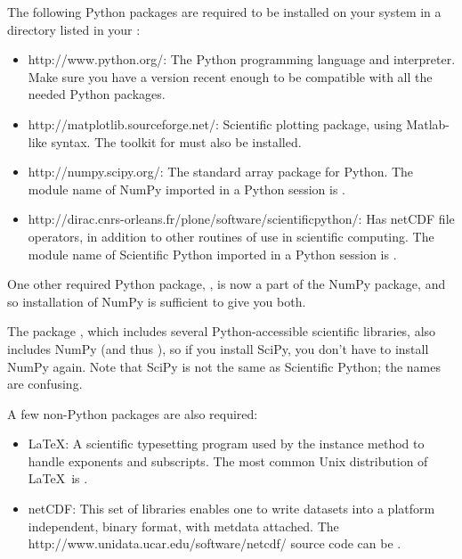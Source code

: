 %


%

The following Python packages are required to be installed on your
system in a directory listed in your :
\begin{itemize}
\item {}%
	{http://www.python.org/}:  The Python programming language
	and interpreter.  Make sure you have a version recent enough
	to be compatible with all the needed Python packages.
\item {}%
	{http://matplotlib.sourceforge.net/}:  Scientific plotting
	package, using Matlab-like syntax.  The  toolkit
	for  must also be installed.
\item {}%
	{http://numpy.scipy.org/}:  The standard array package for
	Python.  The module name of NumPy imported in a Python 
	session is .
\item {}%
	{http://dirac.cnrs-orleans.fr/plone/software/scientificpython/}:
	Has netCDF file operators, in addition to other routines
	of use in scientific computing.  The module name of
	Scientific Python imported in a Python session is
	.
\end{itemize}

One other required Python package, , is now a part of the
NumPy package, and so installation of NumPy is sufficient to give
you both.

The package ,
which includes several Python-accessible scientific libraries, also
includes NumPy (and thus ), so if you install SciPy,
you don't have to install NumPy again.  Note that SciPy is not the
same as Scientific Python; the names are confusing.

A few non-Python packages are also required:
\begin{itemize}
\item \LaTeX: A scientific typesetting program used by the 
	 instance method  to handle 
	exponents and subscripts.  The most common Unix 
	distribution of \LaTeX\ is
	.

\item netCDF:  This set of libraries enables one to write datasets into
	a platform independent, binary format, with metdata attached.
	The %
        	{http://www.unidata.ucar.edu/software/netcdf/}
	source code can be
%
        {}.
\end{itemize}

